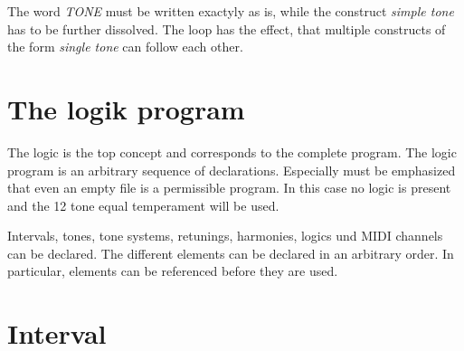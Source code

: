 

The word \textit{TONE} must be written exactyly as is, while the
construct \textit{simple tone} has to be further dissolved. The loop
has the effect, that multiple constructs of the form \textit{single
  tone} can follow each other.

\chapter{The  logik program}\label{cha:das-logikprogramm}
The logic is the top concept and corresponds to the complete
program. The logic program is an arbitrary sequence of
declarations. Especially must be emphasized that
even an empty file is a permissible program. In this case no logic is
present and the 12 tone equal temperament  will be used.
\iffalse
Das Logikprogramm ist der oberste Grammatikbegriff und entspricht
dem gesamten Programm. Das Logikprogramm selbst ist eine beliebige
Folge von Deklarationen\index{Deklarationen}.
Insbesondere ist hervorzuheben, daß auch
gar nichts, also ein leeres File, ein zulässiges Programm ist.
In diesem Fall ist keine Logik vorhanden und die normale
gleichstufig temperierte Stimmung eingestellt.
\fi

Intervals, tones, tone systems, retunings, harmonies, logics und MIDI
channels can be declared. The different elements can be declared in an
arbitrary order. In particular, elements can be referenced before they
are used.
\iffalse
Es können Intervalle, Töne, Tonsysteme, Umstimmungen, Harmonien,
Logiken und MIDI-Kanäle deklariert werden. Die einzelnen Elemente können
in beliebiger Reihenfolge deklariert werden. Insbesondere kann auf
Elemente Bezug genommen werden, die erst später deklariert werden.
\fi



\chapter{Interval}\label{cha:intervall}

